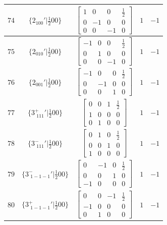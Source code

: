\documentclass[fleqn,8pt]{jsarticle}
\begin{document}
\begin{longtable}{ccccc}
$ 74 $ & $ \{2{}_{100}{}'|\frac{1}{2} 0 0\} $ & $ \begin{bmatrix} 1 & 0 & 0 & \frac{1}{2} \\ 0 & -1 & 0 & 0 \\ 0 & 0 & -1 & 0 \end{bmatrix} $ & $ 1 $ & $ -1 $ \\ \hline
$ 75 $ & $ \{2{}_{010}{}'|\frac{1}{2} 0 0\} $ & $ \begin{bmatrix} -1 & 0 & 0 & \frac{1}{2} \\ 0 & 1 & 0 & 0 \\ 0 & 0 & -1 & 0 \end{bmatrix} $ & $ 1 $ & $ -1 $ \\ \hline
$ 76 $ & $ \{2{}_{001}{}'|\frac{1}{2} 0 0\} $ & $ \begin{bmatrix} -1 & 0 & 0 & \frac{1}{2} \\ 0 & -1 & 0 & 0 \\ 0 & 0 & 1 & 0 \end{bmatrix} $ & $ 1 $ & $ -1 $ \\ \hline
$ 77 $ & $ \{3^{+}_{\,\,111}{}'|\frac{1}{2} 0 0\} $ & $ \begin{bmatrix} 0 & 0 & 1 & \frac{1}{2} \\ 1 & 0 & 0 & 0 \\ 0 & 1 & 0 & 0 \end{bmatrix} $ & $ 1 $ & $ -1 $ \\ \hline
$ 78 $ & $ \{3^{-}_{\,\,111}{}'|\frac{1}{2} 0 0\} $ & $ \begin{bmatrix} 0 & 1 & 0 & \frac{1}{2} \\ 0 & 0 & 1 & 0 \\ 1 & 0 & 0 & 0 \end{bmatrix} $ & $ 1 $ & $ -1 $ \\ \hline
$ 79 $ & $ \{3^{-}_{\,\,1-1-1}{}'|\frac{1}{2} 0 0\} $ & $ \begin{bmatrix} 0 & -1 & 0 & \frac{1}{2} \\ 0 & 0 & 1 & 0 \\ -1 & 0 & 0 & 0 \end{bmatrix} $ & $ 1 $ & $ -1 $ \\ \hline
$ 80 $ & $ \{3^{+}_{\,\,1-1-1}{}'|\frac{1}{2} 0 0\} $ & $ \begin{bmatrix} 0 & 0 & -1 & \frac{1}{2} \\ -1 & 0 & 0 & 0 \\ 0 & 1 & 0 & 0 \end{bmatrix} $ & $ 1 $ & $ -1 $ \\ \hline

\end{longtable}
\end{document}
